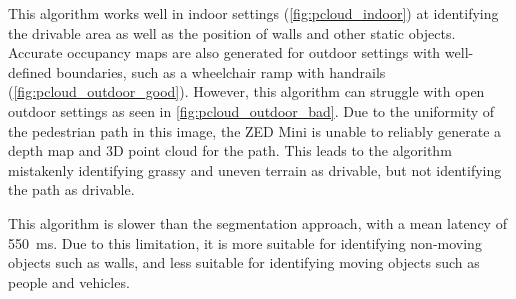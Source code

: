 This algorithm works well in indoor settings (\cref{fig:pcloud_indoor}) at identifying the drivable area
as well as the position of walls and other static objects. Accurate occupancy maps are also generated for
outdoor settings with well-defined boundaries, such as a wheelchair ramp with handrails (\cref{fig:pcloud_outdoor_good}).
However, this algorithm can struggle with open outdoor settings as seen in \cref{fig:pcloud_outdoor_bad}.
Due to the uniformity of the pedestrian path in this image, the ZED Mini is unable to
reliably generate a depth map and 3D point cloud for the path. This leads to the algorithm
mistakenly identifying grassy and uneven terrain as drivable, but not identifying the
path as drivable.

This algorithm is slower than the segmentation approach, with a mean latency of \SI{550}{\milli\second}.
Due to this limitation, it is more suitable for identifying non-moving objects such as walls,
and less suitable for identifying moving objects such as people and vehicles.

